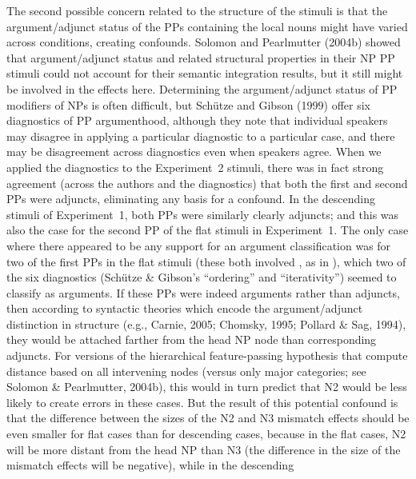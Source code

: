 \documentclass[12pt,titlepage]{article}
\newcommand{\NOTE}[1]{\textbf{*** #1 ***}}  %
\newcommand{\IGNORE}[1]{} %
\begin{document}
\IGNORE{---issues w/flat strucs in HP2 (interacting w/semint manip to yield
diff structures in integ vs unint)\ldots anything to discuss
here? \NOTE{wait for complaints}
}

The second possible concern related to the structure of the stimuli is that
the argument/adjunct status of the PPs containing the local nouns might
have varied across conditions, creating confounds.  Solomon and Pearlmutter
(2004b) showed that argument/adjunct status and related structural
properties in their NP PP stimuli could not account for their semantic
integration results, but it still might be involved in the effects here.
Determining the argument/adjunct status of PP modifiers of NPs is often
difficult, but Sch\"{u}tze and Gibson (1999) offer six diagnostics of PP
argumenthood, although they note that individual speakers may disagree in
applying a particular diagnostic to a particular case, and there may be
disagreement across diagnostics even when speakers agree.  When we applied
the diagnostics to the Experiment~2 stimuli, there was in fact strong
agreement (across the authors and the diagnostics) that both the first and
second PPs were adjuncts, eliminating any basis for a confound.  In the
descending stimuli of Experiment~1, both PPs were similarly clearly
adjuncts; and this was also the case for the second PP of the flat stimuli
in Experiment~1.  The only case where there appeared to be any support for
an argument classification was for two of the first PPs in the flat stimuli
(these both involved , as in ), which two of the six diagnostics
(Sch\"{u}tze \& Gibson's ``ordering'' and ``iterativity'') seemed to
classify as arguments.  If these PPs were indeed arguments rather than
adjuncts, then according to syntactic theories which encode the
argument/adjunct distinction in structure (e.g., Carnie, 2005; Chomsky,
1995; Pollard \& Sag, 1994), they would be attached farther from the head
NP node than corresponding adjuncts.  For versions of the hierarchical
feature-passing hypothesis that compute distance based on all intervening
nodes (versus only major categories; see Solomon \& Pearlmutter, 2004b),
this would in turn predict that N2 would be less likely to create errors in
these cases.  But the result of this potential confound is that the
difference between the sizes of the N2 and N3 mismatch effects should be
even smaller for flat cases than for descending cases, because in the flat
cases, N2 will be more distant from the head NP than N3 (the difference in
the size of the mismatch effects will be negative), while in the descending
\end{document}
